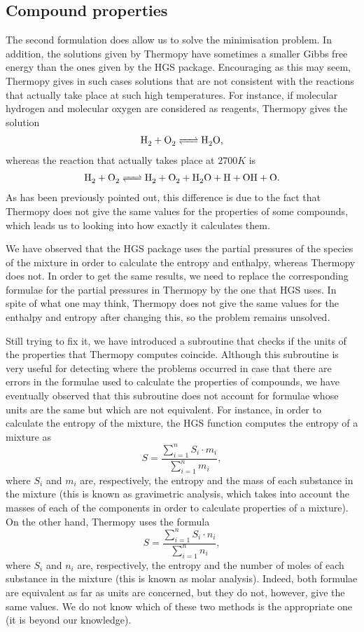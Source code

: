 \documentclass[a4paper,10pt]{article}
\theoremstyle{plain}
\theoremstyle{definition}
\theoremstyle{remark}
\begin{document}
\subsection{Compound properties}
The second formulation does allow us to solve the minimisation problem. In addition, the solutions given by Thermopy have sometimes a smaller Gibbs free energy than the ones given by the HGS package. Encouraging as this may seem, Thermopy gives in such cases solutions that are not consistent with the reactions that actually take place at such high temperatures. For instance, if molecular hydrogen and molecular oxygen are considered as reagents, Thermopy gives the solution
\begin{align}
\cee{H2 + O2 <=> H2O},
\end{align}
whereas the reaction that actually takes place at $2700 K$ is
\begin{align}
\cee{H2 + O2 <=> H2 + O2 + H2O + H + OH + O}.
\end{align}
As has been previously pointed out, this difference is due to the fact that Thermopy does not give the same values for the properties of some compounds, which leads us to looking into how exactly it calculates them.

We have observed that the HGS package uses the partial pressures of the species of the mixture in order to calculate the entropy and enthalpy, whereas Thermopy does not. In order to get the same results, we need to replace the corresponding formulae for the partial pressures in Thermopy by the one that HGS uses. In spite of what one may think, Thermopy does not give the same values for the enthalpy and entropy after changing this, so the problem remains unsolved.

Still trying to fix it, we have introduced a subroutine that checks if the units of the properties that Thermopy computes coincide. Although this subroutine is very useful for detecting where the problems occurred in case that there are errors in the formulae used to calculate the properties of compounds, we have eventually observed that this subroutine does not account for formulae whose units are the same but which are not equivalent. For instance, in order to calculate the entropy of the mixture, the HGS function computes the entropy of a mixture as
\begin{equation}
S = \frac{\sum_{i=1}^n S_i\cdot m_i}{\sum_{i=1}^n m_i},
\end{equation}
where $S_i$ and $m_i$ are, respectively, the entropy and the mass of each substance in the mixture (this is known as gravimetric analysis, which takes into account the masses of each of the components in order to calculate properties of a mixture). On the other hand, Thermopy uses the formula
\begin{equation}
S = \frac{\sum_{i=1}^n S_i\cdot n_i}{\sum_{i=1}^n n_i},
\end{equation}
where $S_i$ and $n_i$ are, respectively, the entropy and the number of moles of each substance in the mixture (this is known as molar analysis). Indeed, both formulae are equivalent as far as units are concerned, but they do not, however, give the same values. We do not know which of these two methods is the appropriate one (it is beyond our knowledge).
\end{document}
